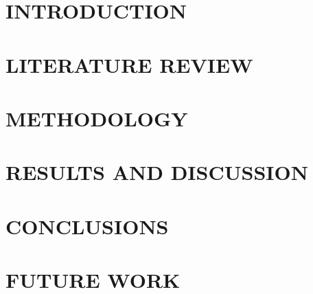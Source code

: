 \documentclass[12pt,twoside]{article}
\begin{document}
\cleardoublepage

\renewcommand{\contentsname}{TABLE OF CONTENTS}
\tableofcontents
\pagebreak
\listoffigures
\listoftables
\cleardoublepage
{}

\section{INTRODUCTION}

\cleardoublepage

\section{LITERATURE REVIEW}

\cleardoublepage

\section{METHODOLOGY}

\cleardoublepage

\section{RESULTS AND DISCUSSION}

\cleardoublepage

\section{CONCLUSIONS}
\cleardoublepage

\section{FUTURE WORK}
\label{sec:future_work}

\cleardoublepage

\printbibliography[title={REFERENCES},heading=bibnumbered]
\cleardoublepage

\appendix

\cleardoublepage

\end{document}
